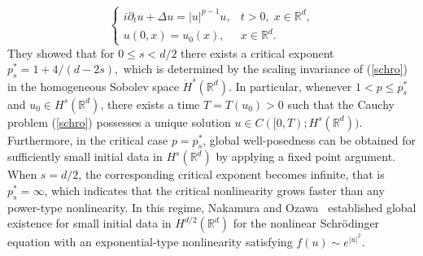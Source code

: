 \documentclass[a4paper,11pt]{amsart}
\renewcommand\eqref[1]{(\ref{#1})} %
\numberwithin{equation}{section}
\theoremstyle{plain}
\theoremstyle{definition}
\begin{document}
\begin{equation}
    \begin{cases} \label{schro}
i\partial_t u + \Delta u = |u|^{p-1}u, & t>0,\; x \in \mathbb{R}^d, \\
u(0,x) = u_0(x), & x \in \mathbb{R}^d .
\end{cases}
\end{equation}
They showed that for $0 \le s < d/2$ there exists a critical exponent $p_s^{*}=1+4/(d-2s),$ which is determined by the scaling invariance of \eqref{schro} in the homogeneous Sobolev space $\dot H^s(\mathbb{R}^d)$. In particular, whenever $1<p\le p_s^{*}$ and $u_0\in H^s(\mathbb{R}^d)$, there exists a time $T=T(u_0)>0$ such that the Cauchy problem \eqref{schro} possesses a unique solution $u\in C([0,T);H^s(\mathbb{R}^d)).$ Furthermore, in the critical case $p=p_s^{*}$, global well-posedness can be obtained for sufficiently small initial data in $H^s(\mathbb{R}^d)$ by applying a fixed point argument. When $s=d/2$, the corresponding critical exponent becomes infinite, that is $p_s^{*}=\infty$, which indicates that the critical nonlinearity grows faster than any power-type nonlinearity. In this regime, Nakamura and Ozawa~\cite{NO98} established global existence for small initial data in $H^{d/2}(\mathbb{R}^d)$ for the nonlinear Schr\"odinger equation with an exponential-type nonlinearity satisfying $f(u)\sim e^{|u|^2}$.
\end{document}
